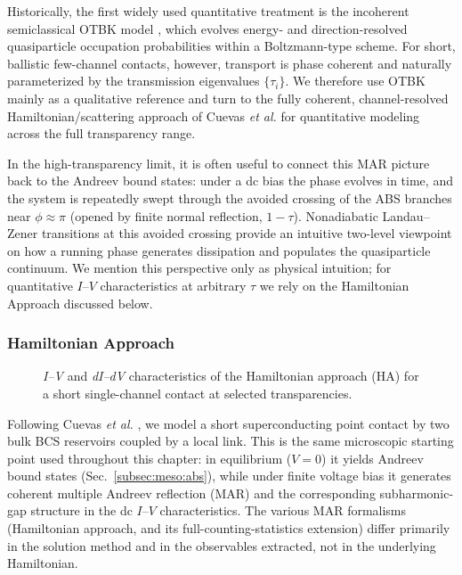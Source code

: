         Historically, the first widely used quantitative treatment is the incoherent semiclassical OTBK model \cite{octavio_subharmonic_1983}, which evolves energy- and direction-resolved quasiparticle occupation probabilities within a Boltzmann-type scheme. For short, ballistic few-channel contacts, however, transport is phase coherent and naturally parameterized by the transmission eigenvalues $\{\tau_i\}$. We therefore use OTBK mainly as a qualitative reference and turn to the fully coherent, channel-resolved Hamiltonian/scattering approach of Cuevas \textit{et al.} for quantitative modeling across the full transparency range.

        In the high-transparency limit, it is often useful to connect this MAR picture back to the Andreev bound states: under a dc bias the phase evolves in time, and the system is repeatedly swept through the avoided crossing of the ABS branches near $\phi\approx\pi$ (opened by finite normal reflection, $1-\tau$). Nonadiabatic Landau--Zener transitions at this avoided crossing provide an intuitive two-level viewpoint on how a running phase generates dissipation and populates the quasiparticle continuum. We mention this perspective only as physical intuition; for quantitative $I$--$V$ characteristics at arbitrary $\tau$ we rely on the Hamiltonian Approach discussed below.

        \subsubsection*{Hamiltonian Approach}

            \begin{figure}[t]
                \centering
                \hfill
                \caption{
                    \textit{I--V} and \textit{dI--dV} characteristics of the Hamiltonian approach (HA) for a short single-channel contact at selected transparencies.
                    }
                \label{fig:meso:mar-ha}
            \end{figure}

            Following Cuevas \textit{et al.} \cite{cuevas_hamiltonian_1996}, we model a short superconducting point contact by two bulk BCS reservoirs coupled by a local link. This is the same microscopic starting point used throughout this chapter: in equilibrium ($V=0$) it yields Andreev bound states (Sec.~\ref{subsec:meso:abs}), while under finite voltage bias it generates coherent multiple Andreev reflection (MAR) and the corresponding subharmonic-gap structure in the dc $I$--$V$ characteristics. The various MAR formalisms (Hamiltonian approach, and its full-counting-statistics extension) differ primarily in the solution method and in the observables extracted, not in the underlying Hamiltonian.


